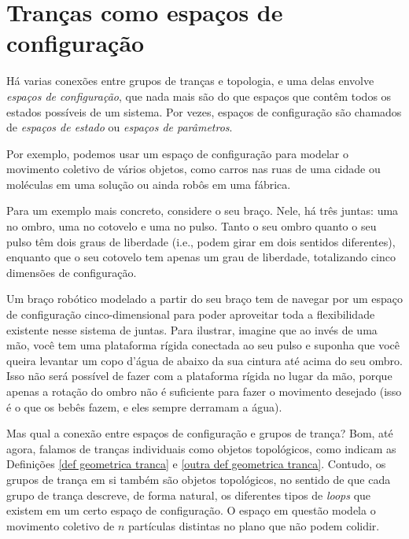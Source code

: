 	\section{Tranças como espaços de configuração}\label{secao trancas como espacos de configuracao}
	Há varias conexões entre grupos de tranças e topologia, e uma delas envolve 
	\textit{espaços de configuração}, que nada mais são do que espaços que contêm 
	todos os estados possíveis de um sistema. Por vezes, espaços de configuração são 
	chamados de \textit{espaços de estado} ou \textit{espaços de parâmetros}.
	
	\par\vspace{0.3cm} Por exemplo, podemos usar um espaço de configuração para modelar o 
	movimento coletivo de vários objetos, como carros nas ruas de uma cidade ou moléculas em 
	uma solução ou ainda robôs em uma fábrica.
	
	\par\vspace{0.3cm} Para um exemplo mais concreto, considere o seu braço. Nele, há três juntas: 
	uma no ombro, uma no cotovelo e uma no pulso. Tanto o seu ombro quanto o seu pulso têm dois 
	graus de liberdade (i.e., podem girar em dois sentidos diferentes), enquanto que o seu cotovelo 
	tem apenas um grau de liberdade, totalizando cinco dimensões de configuração.
	
	\par\vspace{0.3cm} Um braço robótico modelado a partir do seu braço tem de navegar por um 
	espaço de configuração cinco-dimensional para poder aproveitar toda a flexibilidade existente 
	nesse sistema de juntas. Para ilustrar, imagine que ao invés de uma mão, você tem uma plataforma 
	rígida conectada ao seu pulso e suponha que você queira levantar um copo d'água de abaixo da sua 
	cintura até acima do seu ombro. Isso não será possível de fazer com a plataforma rígida no lugar da 
	mão, porque apenas a rotação do ombro não é suficiente para fazer o movimento desejado (isso é 
	o que os bebês fazem, e eles sempre derramam a água).
	
	\par\vspace{0.3cm} Mas qual a conexão entre espaços de configuração e grupos de trança? 
	Bom, até agora, falamos de tranças individuais como objetos topológicos, como indicam as 
	Definições \ref{def geometrica tranca} e \ref{outra def geometrica tranca}. Contudo, os grupos 
	de trança em si também são objetos topológicos, no sentido de que cada grupo de trança descreve, 
	de forma natural, os diferentes tipos de \textit{loops} que existem em um certo espaço de configuração. 
	O espaço em questão modela o movimento coletivo de $n$ partículas distintas no plano que não 
	podem colidir.
	
